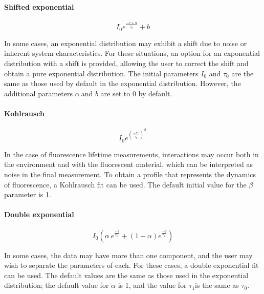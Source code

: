 \documentclass[
]{article}
\begin{document}
\hypertarget{shifted-exponential}{%
\paragraph{Shifted exponential}\label{shifted-exponential}}

\[I_{0}e^{\frac{- \tau + \alpha}{\tau_{0}}} + b\]

In some cases, an exponential distribution may exhibit a shift due to
noise or inherent system characteristics. For these situations, an
option for an exponential distribution with a shift is provided,
allowing the user to correct the shift and obtain a pure exponential
distribution. The initial parameters \(I_{0}\)\hspace{0pt} and
\(\tau_{0}\)\hspace{0pt} are the same as those used by default in the
exponential distribution. However, the additional parameters
\(\alpha\ \)and \(b\) are set to 0 by default.

\hypertarget{kohlrausch}{%
\paragraph{Kohlrausch}\label{kohlrausch}}

\[I_{0}e^{\left( \frac{- \tau\ \ }{\tau_{0}} \right)^{\beta\ }}\]

In the case of fluorescence lifetime measurements, interactions may
occur both in the environment and with the fluorescent material, which
can be interpreted as noise in the final measurement. To obtain a
profile that represents the dynamics of fluorescence, a Kohlrausch fit
can be used. The default initial value for the \(\beta\) parameter is 1.

\hypertarget{double-exponential}{%
\paragraph{Double exponential}\label{double-exponential}}

\[I_{0}\left( \alpha\ e^{\frac{- \tau}{\tau_{0}\ }} + (1 - \alpha)e^{\frac{- \tau}{\tau_{1}\ }} \right)\]

In some cases, the data may have more than one component, and the user
may wish to separate the parameters of each. For these cases, a double
exponential fit can be used. The default values are the same as those
used in the exponential distribution; the default value for \(\alpha\)
is 1, and the value for \(\tau_{1}\)is the same as \(\tau_{0}\).
\end{document}
